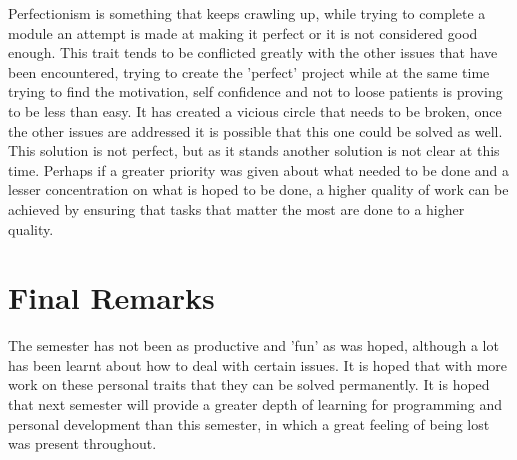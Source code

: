 \documentclass{scrartcl}
\begin{document}
Perfectionism is something that keeps crawling up, while trying to complete a module an attempt is made at making it perfect or it is not considered good enough. This trait tends to be conflicted greatly with the other issues that have been encountered, trying to create the 'perfect' project while at the same time trying to find the motivation, self confidence and not to loose patients is proving to be less than easy. It has created a vicious circle that needs to be broken, once the other issues are addressed it is possible that this one could be solved as well. This solution is not perfect, but as it stands another solution is not clear at this time. Perhaps if a greater priority was given about what needed to be done and a lesser concentration on what is hoped to be done, a higher quality of work can be achieved by ensuring that tasks that matter the most are done to a higher quality.

\section{Final Remarks}

The semester has not been as productive and 'fun' as was hoped, although a lot has been learnt about how to deal with certain issues. It is hoped that with more work on these personal traits that they can be solved permanently. It is hoped that next semester will provide a greater depth of learning for programming and personal development than this semester, in which a great feeling of being lost was present throughout.



\end{document}
